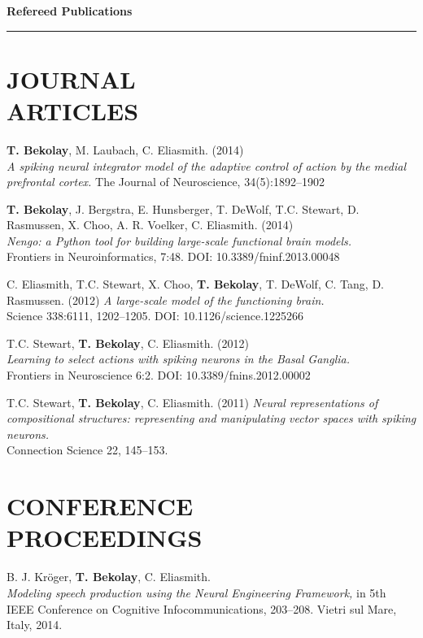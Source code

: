 \documentclass[line,margin]{res}
\begin{document}
\begin{resume}
{\Large \bf Refereed Publications} \\ \vspace{-8pt} \hrule

\section{JOURNAL \\ARTICLES}

\textbf{T. Bekolay}, M. Laubach, C. Eliasmith. (2014) \\
  {\sl A spiking neural integrator model of the adaptive control of action
  by the medial prefrontal cortex.}
  The Journal of Neuroscience, 34(5):1892--1902

\textbf{T. Bekolay}, J. Bergstra, E. Hunsberger, T. DeWolf, T.C. Stewart,
  D. Rasmussen, X. Choo, A. R. Voelker, C. Eliasmith. (2014) \\
  {\sl Nengo: a Python tool for building large-scale functional
  brain models.} \\ Frontiers in Neuroinformatics, 7:48.
  DOI: 10.3389/fninf.2013.00048

C. Eliasmith, T.C. Stewart, X. Choo, \textbf{T. Bekolay},
  T. DeWolf, C. Tang, D. Rasmussen. (2012)
  {\sl A large-scale model of the functioning brain.} \\
  Science 338:6111, 1202--1205. DOI: 10.1126/science.1225266

T.C. Stewart, \textbf{T. Bekolay}, C. Eliasmith. (2012) \\
  {\sl Learning to select actions with spiking neurons in the
  Basal Ganglia.} \\
  Frontiers in Neuroscience 6:2. DOI: 10.3389/fnins.2012.00002

T.C. Stewart, \textbf{T. Bekolay}, C. Eliasmith. (2011)
  {\sl Neural representations of compositional structures:
  representing and manipulating vector spaces with spiking neurons.} \\
  Connection Science 22, 145--153.

\section{CONFERENCE \\PROCEEDINGS}

B. J. Kr\"{o}ger, \textbf{T. Bekolay}, C. Eliasmith. \\
  {\sl Modeling speech
  production using the Neural Engineering Framework,}
  in 5th IEEE Conference on Cognitive Infocommunications, 203--208.
  Vietri sul Mare, Italy, 2014.


\end{resume}
\end{document}
